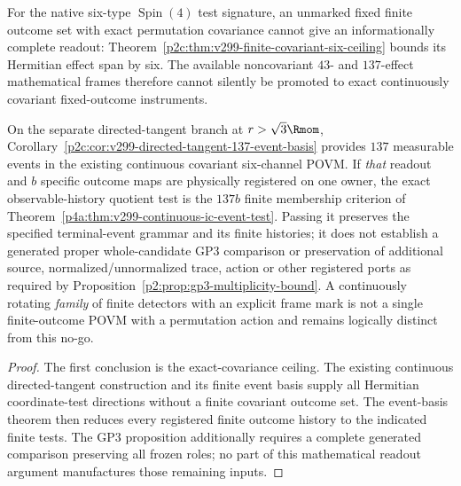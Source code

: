 \documentclass[11pt,a4paper]{article}
\begin{document}
\begin{corollary}
\label{p2f:cor:v299-covariant-ic-gp3-firewall}
For the native six-type $\operatorname{Spin}(4)$ test signature,
an unmarked fixed finite outcome set with exact permutation
covariance cannot give an informationally complete readout:
Theorem~\ref{p2c:thm:v299-finite-covariant-six-ceiling} bounds its
Hermitian effect span by six. The available noncovariant $43$- and
$137$-effect mathematical frames therefore cannot silently be
promoted to exact continuously covariant fixed-outcome instruments.

On the separate directed-tangent branch at
$r>\sqrt3\Rmom$, Corollary~\ref{p2c:cor:v299-directed-tangent-137-event-basis}
provides $137$ measurable events in the existing continuous
covariant six-channel POVM. If \emph{that} readout and $b$ specific
outcome maps are physically registered on one owner, the exact
observable-history quotient test is the $137b$ finite membership
criterion of Theorem~\ref{p4a:thm:v299-continuous-ic-event-test}.
Passing it preserves the specified terminal-event grammar and its
finite histories; it does not establish a generated proper
whole-candidate GP3 comparison or preservation of additional
source, normalized/unnormalized trace, action or other registered
ports as required by Proposition~\ref{p2:prop:gp3-multiplicity-bound}.
A continuously rotating \emph{family} of finite detectors with an
explicit frame mark is not a single finite-outcome POVM with a
permutation action and remains logically distinct from this no-go.
\end{corollary}
\begin{proof}
The first conclusion is the exact-covariance ceiling. The existing
continuous directed-tangent construction and its finite event basis
supply all Hermitian coordinate-test directions without a finite
covariant outcome set. The event-basis theorem then reduces every
registered finite outcome history to the indicated finite tests.
The GP3 proposition additionally requires a complete generated
comparison preserving all frozen roles; no part of this mathematical
readout argument manufactures those remaining inputs.
\end{proof}
\end{document}
